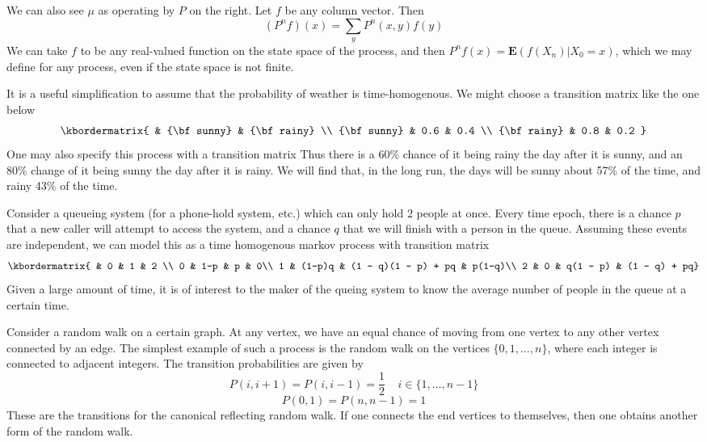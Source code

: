 We can also see $\mu$ as operating by $P$ on the right. Let $f$ be any column vector. Then
%
\[ (P^n f)(x) = \sum_y P^n(x,y) f(y) \]
%
We can take $f$ to be any real-valued function on the state space of the process, and then $P^n f (x) = \mathbf{E}(f(X_n) | X_0 = x)$, which we may define for any process, even if the state space is not finite.

\begin{example}
    It is a useful simplification to assume that the probability of weather is time-homogenous. We might choose a transition matrix like the one below
    \[ \kbordermatrix{
    & {\bf sunny} & {\bf rainy} \\
    {\bf sunny} & 0.6 & 0.4 \\
    {\bf rainy} & 0.8 & 0.2 }
    \]
    One may also specify this process with a transition matrix
    Thus there is a 60\% chance of it being rainy the day after it is sunny, and an 80\% change of it being sunny the day after it is rainy. We will find that, in the long run, the days will be sunny about 57\% of the time, and rainy 43\% of the time.
\end{example}

\begin{example}
    Consider a queueing system (for a phone-hold system, etc.) which can only hold 2 people at once. Every time epoch, there is a chance $p$ that a new caller will attempt to access the system, and a chance $q$ that we will finish with a person in the queue. Assuming these events are independent, we can model this as a time homogenous markov process with transition matrix
    \[ \kbordermatrix{
    & 0 & 1 & 2 \\
    0 & 1-p & p & 0\\
    1 & (1-p)q & (1 - q)(1 - p) + pq & p(1-q)\\
    2 & 0 & q(1 - p) & (1 - q) + pq}
    \]
    Given a large amount of time, it is of interest to the maker of the queing system to know the average number of people in the queue at a certain time.
\end{example}

\begin{example}
    Consider a random walk on a certain graph. At any vertex, we have an equal chance of moving from one vertex to any other vertex connected by an edge. The simplest example of such a process is the random walk on the vertices $\{ 0, 1, \dots, n\}$, where each integer is connected to adjacent integers. The transition probabilities are given by
    \[ P(i,i+1) = P(i,i-1) = \frac{1}{2}\ \ \ \ \ i \in \{1, \dots, n-1 \} \]
    \[ P(0,1) = P(n,n-1) = 1 \]
    These are the transitions for the canonical reflecting random walk. If one connects the end vertices to themselves, then one obtains another form of the random walk.
\end{example}

